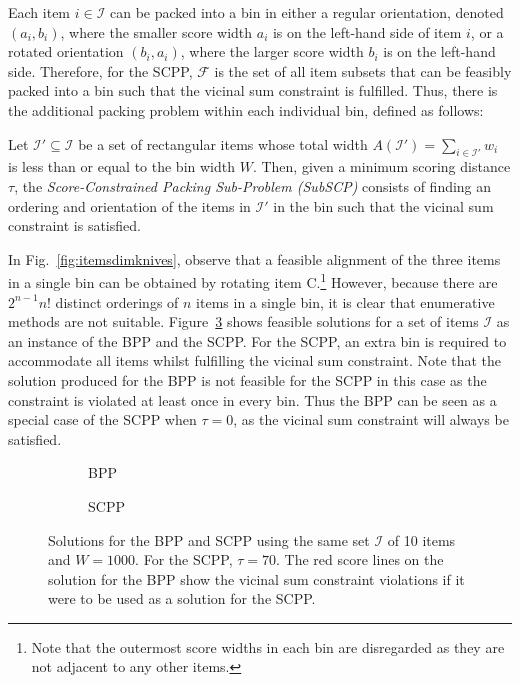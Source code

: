 \documentclass[authoryear]{elsarticle}
\begin{document}
\noindent Each item $i \in \mathcal{I}$ can be packed into a bin in either a regular orientation, denoted $(a_i, b_i)$, where the smaller score width $a_i$ is on the left-hand side of item $i$, or a rotated orientation $(b_i, a_i)$, where the larger score width $b_i$ is on the left-hand side. Therefore, for the SCPP, $\mathcal{F}$ is the set of all item subsets that can be feasibly packed into a bin such that the vicinal sum constraint is fulfilled. Thus, there is the additional packing problem within each individual bin, defined as follows:

\begin{definition}
	Let $\mathcal{I}' \subseteq \mathcal{I}$ be a set of rectangular items whose total width $A(\mathcal{I}') = \sum_{i \in \mathcal{I}'} w_i$ is less than or equal to the bin width $W$. Then, given a minimum scoring distance $\tau$, the \emph{Score-Constrained Packing Sub-Problem (SubSCP)} consists of finding an ordering and orientation of the items in $\mathcal{I}'$ in the bin such that the vicinal sum constraint is satisfied.
	\label{defn:subscp}
\end{definition}


\noindent In Fig.~\ref{fig:itemsdimknives}, observe that a feasible alignment of the three items in a single bin can be obtained by rotating item C.\footnote{Note that the outermost score widths in each bin are disregarded as they are not adjacent to any other items.} However, because there are $2^{n-1} n!$ distinct orderings of $n$ items in a single bin, it is clear that enumerative methods are not suitable. Figure~\ref{fig:bppvscpp} shows feasible solutions for a set of items $\mathcal{I}$ as an instance of the BPP and the SCPP. For the SCPP, an extra bin is required to accommodate all items whilst fulfilling the vicinal sum constraint. Note that the solution produced for the BPP is not feasible for the SCPP in this case as the constraint is violated at least once in every bin. Thus the BPP can be seen as a special case of the SCPP when $\tau=0$, as the vicinal sum constraint will always be satisfied.

\begin{figure}[H]
	\centering	
	\begin{subfigure}[h]{0.42\textwidth}
		
		\caption{BPP}
		\label{fig:bpp}
	\end{subfigure} \hspace{10mm}
	\begin{subfigure}[h]{0.42\textwidth}
		
		\caption{SCPP}
		\label{fig:scpp}
	\end{subfigure}
	\caption{Solutions for the BPP and SCPP using the same set $\mathcal{I}$ of 10 items and $W = 1000$. For the SCPP, $\tau = 70$. The red score lines on the solution for the BPP show the vicinal sum constraint violations if it were to be used as a solution for the SCPP.}	
	\label{fig:bppvscpp}
\end{figure}
\end{document}
